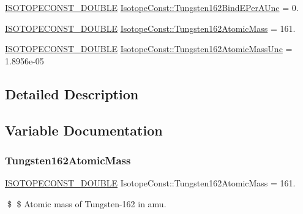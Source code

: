 \begin{DoxyCompactItemize}
\mbox{\hyperlink{group___isotope_const-_macros_ga8f45a7272ce02c0b4c65c44636ed719a}{I\+S\+O\+T\+O\+P\+E\+C\+O\+N\+S\+T\+\_\+\+D\+O\+U\+B\+LE}} \mbox{\hyperlink{group___isotope_const-_tungsten-_w162_ga7ea430090841ffa1a40fb56615103997}{Isotope\+Const\+::\+Tungsten162\+Bind\+E\+Per\+A\+Unc}} = 0.
\item 
\mbox{\hyperlink{group___isotope_const-_macros_ga8f45a7272ce02c0b4c65c44636ed719a}{I\+S\+O\+T\+O\+P\+E\+C\+O\+N\+S\+T\+\_\+\+D\+O\+U\+B\+LE}} \mbox{\hyperlink{group___isotope_const-_tungsten-_w162_ga251afc246035de9754fa5ff415b1620f}{Isotope\+Const\+::\+Tungsten162\+Atomic\+Mass}} = 161.
\item 
\mbox{\hyperlink{group___isotope_const-_macros_ga8f45a7272ce02c0b4c65c44636ed719a}{I\+S\+O\+T\+O\+P\+E\+C\+O\+N\+S\+T\+\_\+\+D\+O\+U\+B\+LE}} \mbox{\hyperlink{group___isotope_const-_tungsten-_w162_ga0f9c0faef78e1b7a6e2631d77717f99d}{Isotope\+Const\+::\+Tungsten162\+Atomic\+Mass\+Unc}} = 1.\+8956e-\/05
\end{DoxyCompactItemize}


\subsection{Detailed Description}


\subsection{Variable Documentation}
\mbox{\label{group___isotope_const-_tungsten-_w162_ga251afc246035de9754fa5ff415b1620f}} 
\subsubsection{\texorpdfstring{Tungsten162\+Atomic\+Mass}{Tungsten162AtomicMass}}
{\footnotesize\ttfamily \mbox{\hyperlink{group___isotope_const-_macros_ga8f45a7272ce02c0b4c65c44636ed719a}{I\+S\+O\+T\+O\+P\+E\+C\+O\+N\+S\+T\+\_\+\+D\+O\+U\+B\+LE}} Isotope\+Const\+::\+Tungsten162\+Atomic\+Mass = 161.}

\$ \$ Atomic mass of Tungsten-\/162 in amu. \mbox{\label{group___isotope_const-_tungsten-_w162_ga0f9c0faef78e1b7a6e2631d77717f99d}} 
